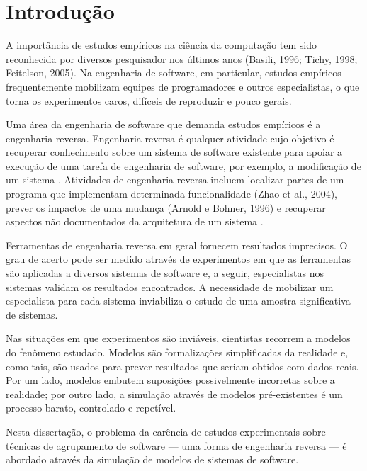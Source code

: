 %

\chapter{Introdução}

A importância de estudos empíricos na ciência da computação tem sido reconhecida por diversos pesquisador nos últimos anos (Basili, 1996; Tichy, 1998; Feitelson, 2005). Na engenharia de software, em particular, estudos empíricos frequentemente mobilizam equipes de programadores e outros especialistas, o que torna os experimentos caros, difíceis de reproduzir e pouco gerais.

Uma área da engenharia de software que demanda estudos empíricos é a engenharia reversa. Engenharia reversa é qualquer atividade cujo objetivo é recuperar conhecimento sobre um sistema de software existente para apoiar a execução de uma tarefa de engenharia de software, por exemplo, a modificação de um sistema \cite{Tonella2007}. Atividades de engenharia reversa incluem localizar partes de um programa que implementam determinada funcionalidade (Zhao et al., 2004), prever os impactos de uma mudança (Arnold e Bohner, 1996) e recuperar aspectos não documentados da arquitetura de um sistema \cite{Pollet2007}.

Ferramentas de engenharia reversa em geral fornecem resultados imprecisos. O grau de acerto pode ser medido através de experimentos em que as ferramentas são aplicadas a diversos sistemas de software e, a seguir, especialistas nos sistemas validam os resultados encontrados. A necessidade de mobilizar um especialista para cada sistema inviabiliza o estudo de uma amostra significativa de sistemas.

Nas situações em que experimentos são inviáveis, cientistas recorrem a modelos do fenômeno estudado. Modelos são formalizações simplificadas da realidade e, como tais, são usados para prever resultados que seriam obtidos com dados reais. Por um lado, modelos embutem suposições possivelmente incorretas sobre a realidade; por outro lado, a simulação através de modelos pré-existentes é um processo barato, controlado e repetível.

Nesta dissertação, o problema da carência de estudos experimentais sobre técnicas de agrupamento de software --- uma forma de engenharia reversa --- é abordado através da simulação de modelos de sistemas de software.

